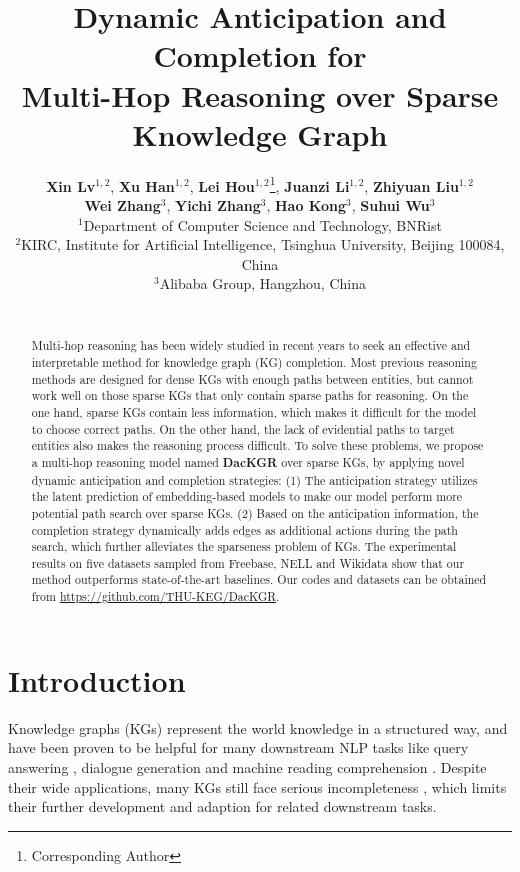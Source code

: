 \documentclass[11pt,a4paper]{article}
\title{Dynamic Anticipation and Completion for \\ Multi-Hop Reasoning over Sparse Knowledge Graph}
\author{
    \textbf{Xin Lv}$^{1,2}$, \textbf{Xu Han}$^{1,2}$, \textbf{Lei Hou}$^{1,2}$\thanks{\quad Corresponding Author}\hspace{0.5em}, \textbf{Juanzi Li}$^{1,2}$, \textbf{Zhiyuan Liu}$^{1,2}$ \\ \textbf{Wei Zhang}$^{3}$, \textbf{Yichi Zhang}$^{3}$, \textbf{Hao Kong}$^{3}$, \textbf{Suhui Wu}$^{3}$\\
    $^1$Department of Computer Science and Technology, BNRist \\
    $^2$KIRC, Institute for Artificial Intelligence, Tsinghua University, Beijing 100084, China \\
     $^3$Alibaba Group, Hangzhou, China \\
    \email{\{lv-x18,hanxu17\}@mails.tsinghua.edu.cn}\\
    \email{\{houlei,lijuanzi,liuzy\}@tsinghua.edu.cn}
    }
\date{}
\begin{document}
\maketitle
\begin{abstract}
Multi-hop reasoning has been widely studied in recent years to seek an effective and interpretable method for knowledge graph (KG) completion. 
Most previous reasoning methods are designed for dense KGs with enough paths between entities, but cannot work well on those sparse KGs that only contain sparse paths for reasoning. 
On the one hand, sparse KGs contain less information, which makes it difficult for the model to choose correct paths. On the other hand, the lack of evidential paths to target entities also makes the reasoning process difficult.
To solve these problems, we propose a multi-hop reasoning model named \textbf{DacKGR} over sparse KGs, by applying novel dynamic anticipation and completion strategies: (1) The anticipation strategy utilizes the latent prediction of embedding-based models to make our model perform more potential path search over sparse KGs. (2) Based on the anticipation information, the completion strategy dynamically adds edges as additional actions during the path search, which further alleviates the sparseness problem of KGs. The experimental results on five datasets sampled from Freebase, NELL and Wikidata show that our method outperforms state-of-the-art baselines. Our codes and datasets can be obtained from \url{https://github.com/THU-KEG/DacKGR}.

\end{abstract}


\section{Introduction}

Knowledge graphs (KGs) represent the world knowledge in a structured way, and have been proven to be helpful for many downstream NLP tasks like query answering \cite{traversing}, dialogue generation \cite{dialogue} and machine reading comprehension \cite{reading}. Despite their wide applications, many KGs still face serious incompleteness \cite{TransE}, which limits their further development and adaption for related downstream tasks. 
\end{document}
